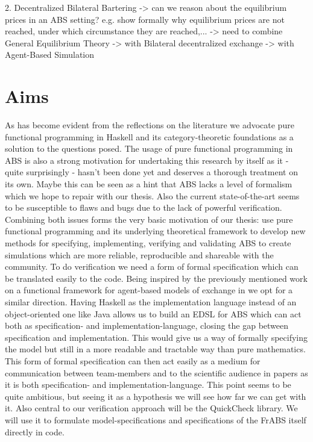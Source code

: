 	2. Decentralized Bilateral Bartering
		-> can we reason about the equilibrium prices in an ABS setting? e.g. show formally why equilibrium prices are not reached, under which circumstance they are reached,...
			-> need to combine General Equilibrium Theory
			-> with Bilateral decentralized exchange
			-> with Agent-Based Simulation 
			

\section{Aims}
As has become evident from the reflections on the literature we advocate pure functional programming in Haskell and its category-theoretic foundations as a solution to the questions posed. The usage of pure functional programming in ABS is also a strong motivation for undertaking this research by itself as it - quite surprisingly - hasn't been done yet and deserves a thorough treatment on its own. Maybe this can be seen as a hint that ABS lacks a level of formalism which we hope to repair with our thesis. Also the current state-of-the-art seems to be susceptible to flaws and bugs due to the lack of powerful verification. Combining both issues forms the very basic motivation of our thesis: use pure functional programming and its underlying theoretical framework to develop new methods for specifying, implementing, verifying and validating ABS to create simulations which are more reliable, reproducible and shareable with the community.
To do verification we need a form of formal specification which can be translated easily to the code. Being inspired by the previously mentioned work on a functional framework for agent-based models of exchange in \cite{botta_functional_2011} we opt for a similar direction. Having Haskell as the implementation language instead of an object-oriented one like Java allows us to build an EDSL for ABS which can act both as specification- and implementation-language, closing the gap between specification and implementation. This would give us a way of formally specifying the model but still in a more readable and tractable way than pure mathematics. This form of formal specification can then act easily as a medium for communication between team-members and to the scientific audience in papers as it is both specification- and implementation-language. This point seems to be quite ambitious, but seeing it as a hypothesis we will see how far we can get with it. Also central to our verification approach will be the QuickCheck library. We will use it to formulate model-specifications and specifications of the FrABS itself directly in code. 
